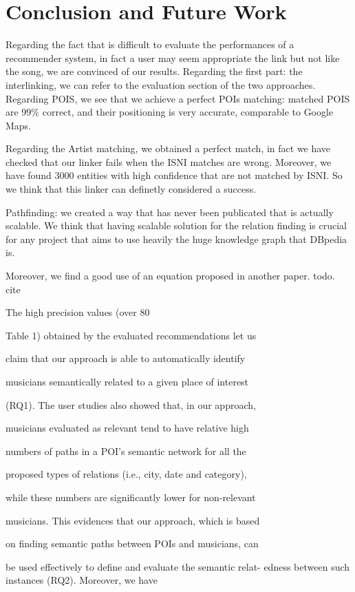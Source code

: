 \documentclass[paper=a4, fontsize=11pt]{scrartcl}
\begin{document}
\section{Conclusion and Future Work}
Regarding the fact that is difficult to evaluate the performances of a recommender system, in fact a user may seem appropriate the link but not like the song, we are convinced of our results.
Regarding the first part: the interlinking, we can refer to the evaluation section of the two approaches. Regarding POIS, we see that we achieve a perfect POIs matching: matched POIS are 99\% correct, and their positioning is very accurate, comparable to Google Maps.

Regarding the Artist matching, we obtained a perfect match, in fact we have checked that our linker fails when the ISNI matches are wrong. Moreover, we have found 3000 entities with high confidence that are not matched by ISNI. So we think that this linker can definetly considered a success.

Pathfinding: we created a way that has never been publicated that is actually scalable. We think that having scalable solution for the relation finding is crucial for any project that aims to use heavily the huge knowledge graph that DBpedia is.

Moreover, we find a good use of an equation proposed in another paper. todo. cite




The high precision values (over 80%

Table 1) obtained by the evaluated recommendations let us

claim that our approach is able to automatically identify

musicians semantically related to a given place of interest

(RQ1). The user studies also showed that, in our approach,

musicians evaluated as relevant tend to have relative high

numbers of paths in a POI’s semantic network for all the

proposed types of relations (i.e., city, date and category),

while these numbers are significantly lower for non-relevant

musicians. This evidences that our approach, which is based

on finding semantic paths between POIs and musicians, can

be used effectively to define and evaluate the semantic relat-
edness between such instances (RQ2). Moreover, we have
\end{document}

